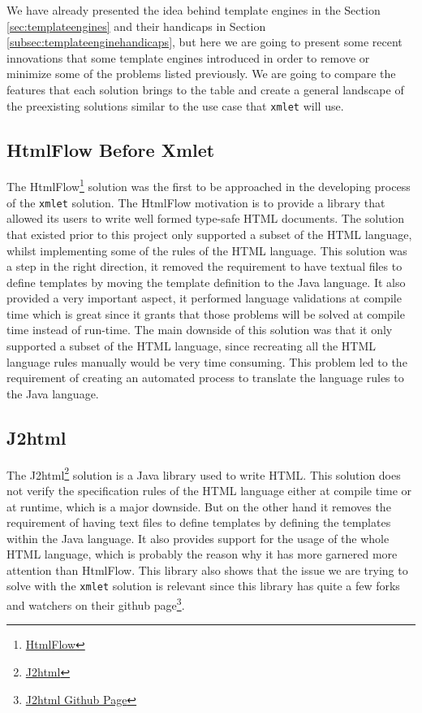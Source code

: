 We have already presented the idea behind template engines in the Section \ref{sec:templateengines} and their handicaps in Section  \ref{subsec:templateenginehandicaps}, but here we are going to present some recent innovations that some template engines introduced in order to remove or minimize some of the problems listed previously. We are going to compare the features that each solution brings to the table and create a general landscape of the preexisting solutions similar to the use case that \texttt{xmlet} will use.

\subsection{HtmlFlow Before Xmlet}
\label{sec:htmlflowbeforexmlet}

The HtmlFlow\footnote{\href{https://github.com/xmlet/HtmlFlow}{HtmlFlow}} solution was the first to be approached in the developing process of the \texttt{xmlet} solution. The HtmlFlow motivation is to provide a library that allowed its users to write well formed type-safe \ac{HTML} documents. The solution that existed prior to this project only supported a subset of the \ac{HTML} language, whilst implementing some of the rules of the \ac{HTML} language. This solution was a step in the right direction, it removed the requirement to have textual files to define templates by moving the template definition to the Java language. It also provided a very important aspect, it performed language validations at compile time which is great since it grants that those problems will be solved at compile time instead of run-time. The main downside of this solution was that it only supported a subset of the \ac{HTML} language, since recreating all the \ac{HTML} language rules manually would be very time consuming. This problem led to the requirement of creating an automated process to translate the language rules to the Java language.


\subsection{J2html} %
\label{sec:j2html}

The J2html\footnote{\href{https://j2html.com/}{J2html}} solution is a Java library used to write \ac{HTML}. This solution does not verify the specification rules of the \ac{HTML} language either at compile time or at runtime, which is a major downside. But on the other hand it removes the requirement of having text files to define templates by defining the templates within the Java language. It also provides support for the usage of the whole \ac{HTML} language, which is probably the reason why it has more garnered more attention than HtmlFlow. This library also shows that the issue we are trying to solve with the \texttt{xmlet} solution is relevant since this library has quite a few forks and watchers on their github page\footnote{\href{https://github.com/tipsy/j2html}{J2html Github Page}}. 

